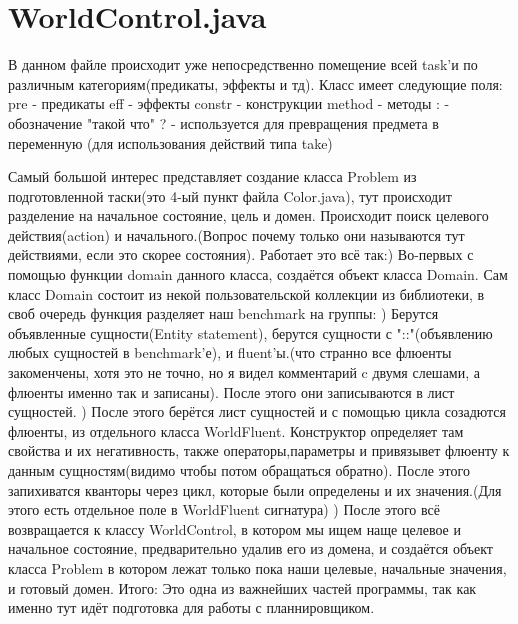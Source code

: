 \documentclass{article}
\begin{document}
\section*{\hypertarget{WorldControl}{WorldControl.java}}
В данном файле происходит уже непосредственно помещение всей task'и по различным категориям(предикаты, эффекты и тд). Класс имеет следующие поля: \newline
pre - предикаты \newline
eff - эффекты \newline
constr - конструкции \newline
method - методы \newline
: - обозначение "такой что" \newline
? - используется для превращения предмета в переменную (для использования действий типа take)\newline

Самый большой интерес представляет создание класса Problem из подготовленной таски(это 4-ый пункт файла Color.java), тут происходит разделение на начальное состояние, цель и домен. Происходит поиск целевого действия(action) и начального.(Вопрос почему только они называются тут действиями, если это скорее состояния). Работает это всё так:) Во-первых с помощью функции domain данного класса, создаётся объект класса Domain. Сам класс Domain состоит из некой пользовательской коллекции из библиотеки, в своб очередь функция разделяет наш benchmark на группы: ) Берутся объявленные сущности(Entity statement), берутся сущности с "::"(объявлению любых сущностей в benchmark'е), и fluent'ы.(что странно все флюенты закоменчены, хотя это не точно, но я видел комментарий c двумя слешами, а флюенты именно так и записаны). После этого они записываются в лист сущностей. ) После этого берётся лист сущностей и с помощью цикла созадются флюенты, из отдельного класса WorldFluent. Конструктор определяет там свойства и их негативность, также операторы,параметры и привязывет флюенту к данным сущностям(видимо чтобы потом обращаться обратно). После этого запихиватся кванторы через цикл, которые были определены и их значения.(Для этого есть отдельное поле в WorldFluent сигнатура) ) После этого всё возвращается к классу WorldControl, в котором мы ищем наще целевое и начальное состояние, предварительно удалив его из домена, и создаётся объект класса Problem в котором лежат только пока наши целевые, начальные значения, и готовый домен. \newline
Итого: Это одна из важнейших частей программы, так как именно тут идёт подготовка для работы с планнировщиком.
\end{document}
